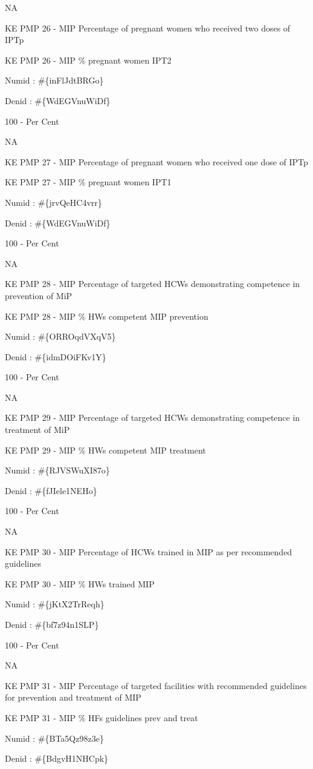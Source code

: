 \documentclass[]{book}
\begin{document}
NA

KE PMP 26 - MIP Percentage of pregnant women who received two doses of IPTp

KE PMP 26 - MIP \% pregnant women IPT2

Numid : \#\{inFlJdtBRGo\}

Denid : \#\{WdEGVnuWiDf\}

100 - Per Cent

NA

KE PMP 27 - MIP Percentage of pregnant women who received one dose of IPTp

KE PMP 27 - MIP \% pregnant women IPT1

Numid : \#\{jrvQeHC4vrr\}

Denid : \#\{WdEGVnuWiDf\}

100 - Per Cent

NA

KE PMP 28 - MIP Percentage of targeted HCWs demonstrating competence in prevention of MiP

KE PMP 28 - MIP \% HWs competent MIP prevention

Numid : \#\{ORROqdVXqV5\}

Denid : \#\{idmDOiFKv1Y\}

100 - Per Cent

NA

KE PMP 29 - MIP Percentage of targeted HCWs demonstrating competence in treatment of MiP

KE PMP 29 - MIP \% HWs competent MIP treatment

Numid : \#\{RJVSWuXI87o\}

Denid : \#\{fJIele1NEHo\}

100 - Per Cent

NA

KE PMP 30 - MIP Percentage of HCWs trained in MIP as per recommended guidelines

KE PMP 30 - MIP \% HWs trained MIP

Numid : \#\{jKtX2TrReqh\}

Denid : \#\{bf7z94n1SLP\}

100 - Per Cent

NA

KE PMP 31 - MIP Percentage of targeted facilities with recommended guidelines for prevention and treatment of MIP

KE PMP 31 - MIP \% HFs guidelines prev and treat

Numid : \#\{BTa5Qz98z3e\}

Denid : \#\{BdgvH1NHCpk\}
\end{document}
